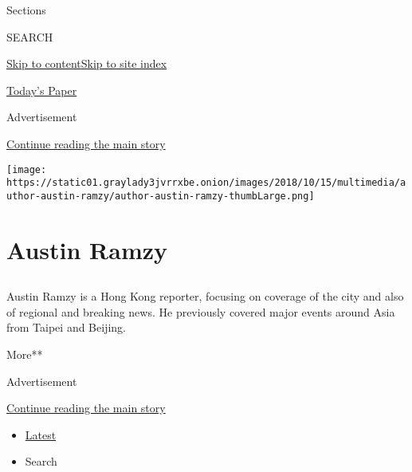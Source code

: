 Sections

SEARCH

\protect\hyperlink{site-content}{Skip to
content}\protect\hyperlink{site-index}{Skip to site index}

\href{https://myaccount.nytimes3xbfgragh.onion/auth/login?response_type=cookie\&client_id=vi}{}

\href{https://www.nytimes3xbfgragh.onion/section/todayspaper}{Today's
Paper}

Advertisement

\protect\hyperlink{after-top}{Continue reading the main story}

\texttt{[image: https://static01.graylady3jvrrxbe.onion/images/2018/10/15/multimedia/author-austin-ramzy/author-austin-ramzy-thumbLarge.png]}

\hypertarget{austin-ramzy}{%
\section{Austin Ramzy}\label{austin-ramzy}}

\subsection{}

Austin Ramzy is a Hong Kong reporter, focusing on coverage of the city
and also of regional and breaking news. He previously covered major
events around Asia from Taipei and Beijing.

More**

Advertisement

\protect\hyperlink{after-mid1}{Continue reading the main story}

\begin{itemize}
\tightlist
\item
  \protect\hyperlink{stream-panel}{Latest}
\item
  Search
\end{itemize}

